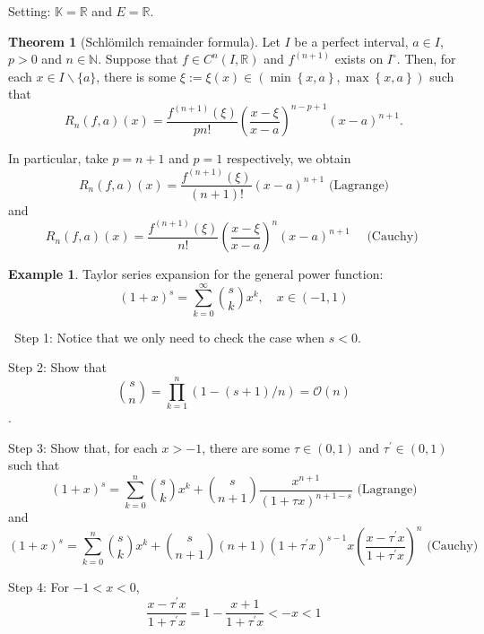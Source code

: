 \documentclass[12pt,a4paper]{book}
\newenvironment{prooff}{{\noindent\it\textcolor{cyan!40!black}{Proof}:}\,}{\par}
\newcommand{\bbrace}[1]{\left\{ #1 \right\} }
\newcommand{\bb}[1]{\mathbb{#1}}
\newcommand{\p}{^{\prime}}
\theoremstyle{definition}
\newtheorem{theo}[defn]{Theorem}
\newtheorem{exam}[defn]{Example}
\begin{document}
Setting: $\bb{K}=\bb{R}$ and $E=\bb{R}$. 
\begin{theo}[Schlömilch remainder formula]
    Let $I$ be a perfect interval, $a \in I$, $p>0$ and $n \in \mathbb{N}$. Suppose that $f \in C^n(I, \mathbb{R})$ and $f^{(n+1)}$ exists on $I^{\circ}$. 
    Then, for each $x \in I \backslash\{a\}$, there is some $\xi:=\xi(x) \in(\min\bbrace{x,a}, \max\bbrace{x,a})$ such that
    $$
    R_n(f, a)(x)=\frac{f^{(n+1)}(\xi)}{p n!}\left(\frac{x-\xi}{x-a}\right)^{n-p+1}(x-a)^{n+1} .
    $$

    In particular, take $p=n+1$ and $p=1$ respectively, we obtain
    $$
    R_n(f, a)(x)=\frac{f^{(n+1)}(\xi)}{(n+1)!}(x-a)^{n+1}\text{ (Lagrange)}
    $$
    and
    $$
    R_n(f, a)(x)=\frac{f^{(n+1)}(\xi)}{n!}\left(\frac{x-\xi}{x-a}\right)^n(x-a)^{n+1} \quad \text { (Cauchy) }
    $$
    
\end{theo}
\begin{exam}
Taylor series expansion for the general power function: 
$$
(1+x)^s=\sum_{k=0}^{\infty}\binom{s}{k} x^k, \quad x \in(-1,1)
$$
\end{exam}
\begin{prooff}
    Step 1: Notice that we only need to check the case when $s<0$.

    Step 2: Show that $$\binom{s}{n}=\prod_{k=1}^n(1-(s+1)/n)=\mathcal{O}(n)$$.

    Step 3: Show that, for each $x>-1$, there are some $\tau \in(0,1)$ and $\tau\p\in(0,1)$ 
    such that
    $$
    (1+x)^s=\sum_{k=0}^n\binom{s}{k} x^k+\binom{s}{n+1} \frac{x^{n+1}}{(1+\tau x)^{n+1-s}} \text{ (Lagrange)}
    $$
    and 
    $$
    (1+x)^s=\sum_{k=0}^n\binom{s}{k} x^k+\binom{s}{n+1}(n+1)(1+\tau\p x)^{s-1}x(\frac{x-\tau\p x}{1+\tau\p x})^n  \text{ (Cauchy)}
    $$

    Step 4: For $-1<x<0$,
    $$
    \frac{x-\tau\p x}{1+\tau\p x}=1-\frac{x+1}{1+\tau\p x}<-x<1
    $$
\end{prooff}
\end{document}
